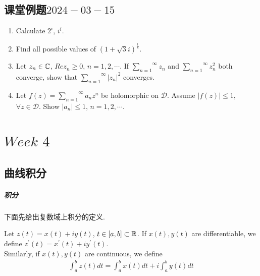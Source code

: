 \section{课堂例题$2024-03-15$}
	\begin{enumerate}
		\item Calculate $2^i$, $i^i$.
		
		\vspace{2em}
		
		\item Find all possible values of $(1 + \sqrt{3}i)^{\frac{1}{8}}$.
		
		\vspace{2em}
		
		\item Let $z_n \in \mathbb{C}$, $Rez_n \geq 0$, $n = 1 , 2 , \cdots$. If $\overset{\infty}{\underset{n = 1}{\sum}}{z_n}$ and $\overset{\infty}{\underset{n = 1}{\sum}}{z_{n}^2}$ both converge, show that $\overset{\infty}{\underset{n = 1}{\sum}}{\left| z_n \right|^2}$ converges.
		
		\vspace{2em}
		
		\item Let $f(z) = \overset{\infty}{\underset{n = 1}{\sum}}{a_n z^n}$ be holomorphic on $\mathcal{D}$. Assume $\left| f(z) \right| \leq 1$, $\forall z \in \mathcal{D}$. Show $\left| a_n \right| \leq 1$, $n = 1 , 2 , \cdots$.
		
		\vspace{2em}
	\end{enumerate}

\chapter{$Week \,\, 4$}
\section{曲线积分}
\paragraph{积分}
	下面先给出复数域上积分的定义.
	\begin{defn}\label{def 4.1.1}
		Let $z(t) = x(t) + i y(t)$, $t \in [a , b] \subset \mathbb{R}$. If $x(t) , y(t)$ are differentiable, we define $z^{'}(t) = x^{'}(t) + i y^{'}(t)$.\\
		Similarly, if $x(t) , y(t)$ are continuous, we define
		\begin{align}
			\int_{a}^{b}{z(t) dt} = \int_{a}^{b}{x(t) dt} + i \int_{a}^{b}{y(t) dt}
		\end{align}
	\end{defn}

